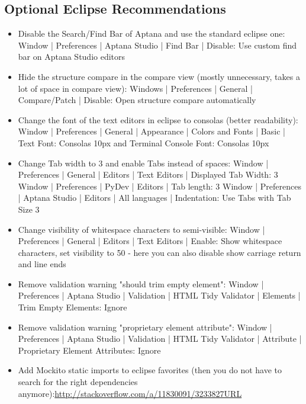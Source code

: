 \subsection{Optional Eclipse Recommendations}
\begin{itemize}
	
	\item Disable the Search/Find Bar of Aptana and use the standard eclipse one:\newline
	Window | Preferences | Aptana Studio | Find Bar | Disable: Use custom find bar on Aptana Studio editors
	\item Hide the structure compare in the compare view (mostly unnecessary, takes a lot of space in compare view):\newline
	Windows | Preferences | General | Compare/Patch | Disable: Open structure compare automatically
	\item Change the font of the text editors in eclipse to consolas (better readability):\newline
	Window | Preferences | General | Appearance | Colors and Fonts |
	Basic | Text Font: Consolas 10px
	and
	Terminal Console Font: Consolas 10px
	\item Change Tab width to 3 and enable Tabs instead of spaces:\newline
	Window | Preferences | General | Editors | Text Editors | Displayed Tab Width: 3
	Window | Preferences | PyDev | Editors | Tab length: 3
	Window | Preferences | Aptana Studio | Editors | {{ All languages }} | Indentation: Use Tabs with Tab Size 3
	\item Change visibility of whitespace characters to semi-visible:\newline
	Window | Preferences | General | Editors | Text Editors | Enable: Show whitespace characters, set visibility to 50 - here you can also disable show carriage return and line ends
	\item Remove validation warning "should trim empty element":\newline
	Window | Preferences | Aptana Studio | Validation | HTML Tidy Validator | Elements | Trim Empty Elements: Ignore
	\item Remove validation warning "proprietary element attribute":\newline
	Window | Preferences | Aptana Studio | Validation | HTML Tidy Validator | Attribute | Proprietary Element Attributes: Ignore
	\item Add Mockito static imports to eclipse favorites (then you do not have to search for the right dependencies anymore):\newline \url{http://stackoverflow.com/a/11830091/3233827URL}\newline

\end{itemize}
